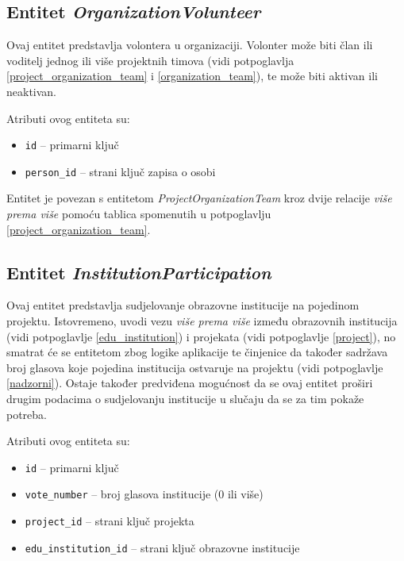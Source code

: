 \documentclass[times, utf8, diplomski]{fer}
\begin{document}
\subsection{Entitet \emph{OrganizationVolunteer}} \label{organization_volunteer}

Ovaj entitet predstavlja volontera u organizaciji. Volonter može biti član ili
voditelj jednog ili više projektnih timova (vidi potpoglavlja
\ref{project_organization_team} i \ref{organization_team}), te može biti aktivan
ili neaktivan.

\medskip
Atributi ovog entiteta su:
\begin{itemize}
    \item \texttt{id} -- primarni ključ
    \item \texttt{person\_id} -- strani ključ zapisa o osobi
\end{itemize}

Entitet je povezan s entitetom \emph{ProjectOrganizationTeam} kroz dvije
relacije \emph{više prema više} pomoću tablica spomenutih u potpoglavlju
\ref{project_organization_team}.

\subsection{Entitet \emph{InstitutionParticipation}}
\label{institution_participation}

Ovaj entitet predstavlja sudjelovanje obrazovne institucije na pojedinom
projektu. Istovremeno, uvodi vezu \emph{više prema više} između obrazovnih
institucija (vidi potpoglavlje \ref{edu_institution}) i projekata (vidi potpoglavlje
\ref{project}), no smatrat će se entitetom zbog logike aplikacije te činjenice da
također sadržava broj glasova koje pojedina institucija ostvaruje na projektu
(vidi potpoglavlje \ref{nadzorni}). Ostaje također predviđena mogućnost da se
ovaj entitet proširi drugim podacima o sudjelovanju institucije u slučaju da se
za tim pokaže potreba.

\medskip
Atributi ovog entiteta su:
\begin{itemize}
    \item \texttt{id} -- primarni ključ
    \item \texttt{vote\_number} -- broj glasova institucije (0 ili više)
    \item \texttt{project\_id} -- strani ključ projekta
    \item \texttt{edu\_institution\_id} -- strani ključ obrazovne institucije
\end{itemize}
\end{document}
